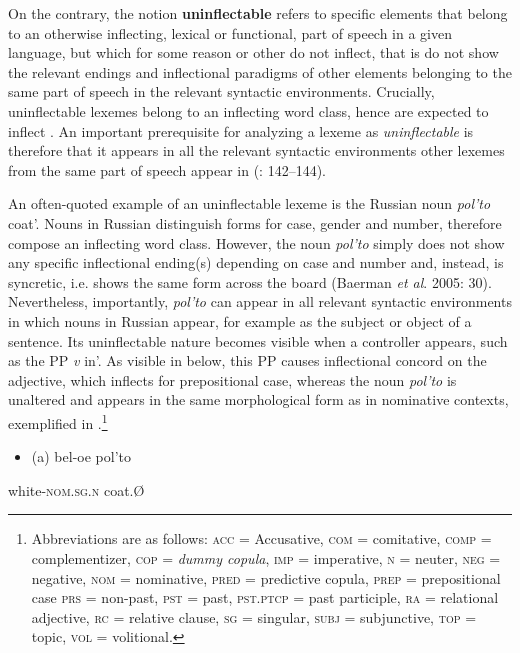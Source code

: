 \documentclass[output=paper]{langscibook}
\begin{document}
On the contrary, the notion \textbf{uninflectable} refers to specific elements that belong to an otherwise inflecting, lexical or functional, part of speech in a given language, but which for some reason or other do not inflect, that is do not show the relevant endings and inflectional paradigms of other elements belonging to the same part of speech in the relevant syntactic environments. Crucially, uninflectable lexemes belong to an inflecting word class, hence are expected to inflect \citep[142]{Spencer2020}. An important prerequisite for analyzing a lexeme as \textit{uninflectable} is therefore that it appears in all the relevant syntactic environments other lexemes from the same part of speech appear in (\citealt{Spencer2020}: 142–144).

An often-quoted example of an uninflectable lexeme is the Russian noun \textit{pol’to} {\textasciigrave}coat’. Nouns in Russian distinguish forms for case, gender and number, therefore compose an inflecting word class. However, the noun \textit{pol’to} simply does not show any specific inflectional ending(s) depending on case and number and, instead, is syncretic, i.e. shows the same form across the board (Baerman \textit{et al}. 2005: 30). Nevertheless, importantly, \textit{pol’to} can appear in all relevant syntactic environments in which nouns in Russian appear, for example as the subject or object of a sentence. Its uninflectable nature becomes visible when a controller appears, such as the PP \textit{v} {\textasciigrave}in’. As visible in  below, this PP causes inflectional concord on the adjective, which inflects for prepositional case, whereas the noun \textit{pol’to} is unaltered and appears in the same morphological form as in nominative contexts, exemplified in .\footnote{Abbreviations are as follows: \textsc{acc} = Accusative, \textsc{com} = comitative, \textsc{comp} = complementizer, \textsc{cop} = \textit{dummy copula}, \textsc{imp} = imperative, \textsc{n} = neuter, \textsc{neg} = negative, \textsc{nom} = nominative, \textsc{pred} = predictive copula, \textsc{prep} = prepositional case \textsc{prs} = non-past, \textsc{pst} = past, \textsc{pst.ptcp} = past participle, \textsc{ra} = relational adjective, \textsc{rc} = relative clause, \textsc{sg} = singular, \textsc{subj} = subjunctive, \textsc{top} = topic, \textsc{vol} = volitional.}

\begin{itemize}
\item \begin{styleBeispielCinqueKapitel}
(a) bel-oe pol’to
\end{styleBeispielCinqueKapitel}
\end{itemize}
\begin{styleBeispielCinqueKapitel}
white-\textsc{nom.sg.n} coat.Ø
\end{styleBeispielCinqueKapitel}
\end{document}
